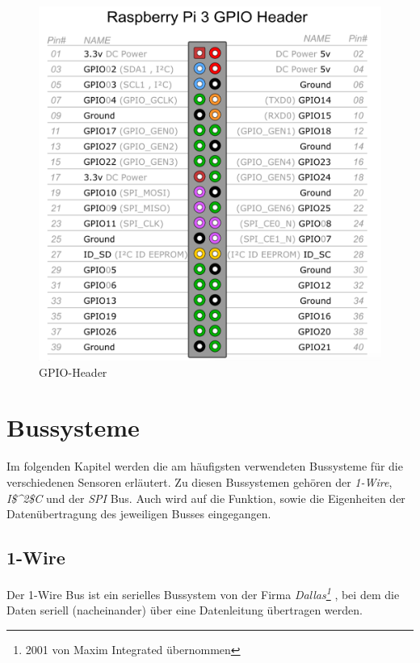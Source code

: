 \begin{figure}[!h] 
  \centering
     \includegraphics[scale=.35]{BilderAllgemein/GPIO.png}
  \caption{GPIO-Header \citep{GPIO_Header_Bild}}
  \label{Abb_Bild_GPIO}
\end{figure}

\section{Bussysteme}
\label{section_Bussysteme}
Im folgenden Kapitel werden die am häufigsten verwendeten Bussysteme für die verschiedenen Sensoren erläutert. Zu diesen Bussystemen gehören der \textit{1-Wire}, \textit{\ac{I$^2$C}} und der \textit{\ac{SPI}} Bus. Auch wird auf die Funktion, sowie die Eigenheiten der Datenübertragung des jeweiligen Busses eingegangen.

\subsection{1-Wire}
\label{subsection_1Wire}
Der 1-Wire Bus ist ein serielles Bussystem von der Firma \textit{Dallas\footnote{2001 von Maxim Integrated übernommen}} , bei dem die Daten seriell (nacheinander) über eine Datenleitung übertragen werden.
